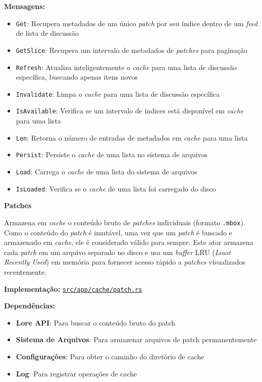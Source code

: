 \textbf{Mensagens:}

\begin{itemize}
    \item \texttt{Get}: Recupera metadados de um único \emph{patch} por seu índice dentro de um \emph{feed} de lista de discussão
    \item \texttt{GetSlice}: Recupera um intervalo de metadados de \emph{patches} para paginação
    \item \texttt{Refresh}: Atualiza inteligentemente o \emph{cache} para uma lista de discussão específica, buscando apenas itens novos
    \item \texttt{Invalidate}: Limpa o \emph{cache} para uma lista de discussão específica
    \item \texttt{IsAvailable}: Verifica se um intervalo de índices está disponível em \emph{cache} para uma lista
    \item \texttt{Len}: Retorna o número de entradas de metadados em \emph{cache} para uma lista
    \item \texttt{Persist}: Persiste o \emph{cache} de uma lista no sistema de arquivos
    \item \texttt{Load}: Carrega o \emph{cache} de uma lista do sistema de arquivos
    \item \texttt{IsLoaded}: Verifica se o \emph{cache} de uma lista foi carregado do disco
\end{itemize}

\textbf{Patches}

Armazena em \emph{cache} o conteúdo bruto de \emph{patches} individuais (formato \texttt{.mbox}). Como o conteúdo do \emph{patch} é imutável, uma vez que um \emph{patch} é buscado e armazenado em \emph{cache}, ele é considerado válido para sempre. Este ator armazena cada \emph{patch} em um arquivo separado no disco e usa um \emph{buffer} LRU (\emph{Least Recently Used}) em memória para fornecer acesso rápido a \emph{patches} visualizados recentemente.

\textbf{Implementação:} \href{https://github.com/nahharris/ph-actors-tcc/blob/master/src/app/cache/patch.rs}{\texttt{src/app/cache/patch.rs}}

\textbf{Dependências:}

\begin{itemize}
    \item \textbf{Lore API}: Para buscar o conteúdo bruto do patch
    \item \textbf{Sistema de Arquivos}: Para armazenar arquivos de patch permanentemente
    \item \textbf{Configurações}: Para obter o caminho do diretório de cache
    \item \textbf{Log}: Para registrar operações de cache
\end{itemize}

